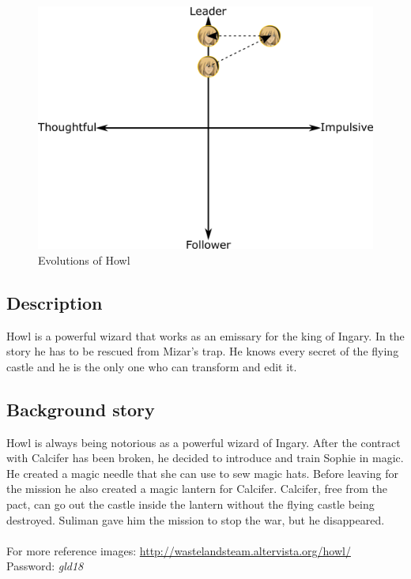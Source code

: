\begin{figure}[H]
  \centering
  \includegraphics[width=14cm]{Images/Diagrams/Evolutions/howlEvolution}
  \caption{Evolutions of Howl}
\end{figure}


\subsection{Description}
Howl is a powerful wizard that works as an emissary for the king of Ingary. In the story he has to be rescued from Mizar's trap. He knows every secret of the flying castle and he is the only one who can transform and edit it.

\subsection{Background story}
Howl is always being notorious as a powerful wizard of Ingary. After the contract with Calcifer has been broken, he decided to introduce and train Sophie in magic. He created a magic needle that she can use to sew magic hats. Before leaving for the mission he also created a magic lantern for Calcifer. Calcifer, free from the pact, can go out the castle inside the lantern without the flying castle being destroyed. Suliman gave him the mission to stop the war, but he disappeared.
\\\\
For more reference images: \href{http://wastelandsteam.altervista.org/howl/}{http://wastelandsteam.altervista.org/howl/}\\
Password: \textit{gld18}
